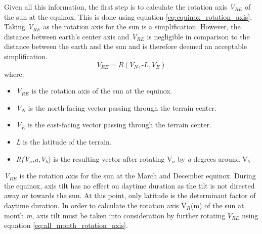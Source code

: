 Given all this information, the first step is to calculate the rotation axis \textit{V$_{RE}$} of the sun at the equinox. This is done using equation \ref{eq:equinox_rotation_axis}. Taking \textit{V$_{RE}$} as the rotation axis for the sun is a simplification. However, the distance between earth's center axis and \textit{V$_{RE}$} is negligible in comparison to the distance between the earth and the sun and is therefore deemed an acceptable simplification.\\

\begin{equation} \label{eq:equinox_rotation_axis}
	V_{RE} = R(V_{N}, \textit{-L}, V_{E})
\end{equation}
where:
\begin{itemize}
\item \textit{V$_{RE}$} is the rotation axis of the sun at the equinox.\\
\item \textit{V$_{N}$} is the north-facing vector passing through the terrain center.\\
\item \textit{V$_{E}$} is the east-facing vector passing through the terrain center.\\
\item \textit{L} is the latitude of the terrain.\\
\item \textit{R(V$_{a}$,\textit{a},V$_{b}$}) is the resulting vector after rotating V$_{a}$ by \textit{a} degrees around V$_{b}$\\
\end{itemize}

\textit{V$_{RE}$} is the rotation axis for the sun at the March and December equinox. During the equinox, axis tilt has no effect on daytime duration as the tilt is not directed away or towards the sun. At this point, only latitude is the determinant factor of daytime duration. In order to calculate the rotation axis V$_{R}$(m) of the sun at month \textit{m}, axis tilt must be taken into consideration by further rotating $V_{RE}$ using equation \ref{eq:all_month_rotation_axis}.

